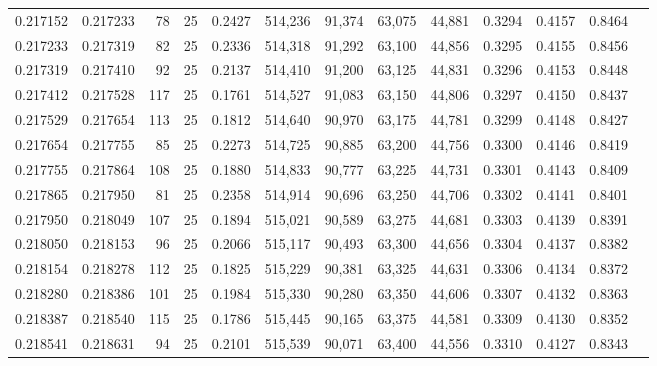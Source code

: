 \begin{tabular}{rrrrrrrrrrrrr}
0.217152 & 0.217233 &    78 &  25 &                                     0.2427 & 514,236 &  91,374 &  63,075 &  44,881 & 0.3294 & 0.4157 & 0.8464 \\
0.217233 & 0.217319 &    82 &  25 &                                     0.2336 & 514,318 &  91,292 &  63,100 &  44,856 & 0.3295 & 0.4155 & 0.8456 \\
0.217319 & 0.217410 &    92 &  25 &                                     0.2137 & 514,410 &  91,200 &  63,125 &  44,831 & 0.3296 & 0.4153 & 0.8448 \\
0.217412 & 0.217528 &   117 &  25 &                                     0.1761 & 514,527 &  91,083 &  63,150 &  44,806 & 0.3297 & 0.4150 & 0.8437 \\
0.217529 & 0.217654 &   113 &  25 &                                     0.1812 & 514,640 &  90,970 &  63,175 &  44,781 & 0.3299 & 0.4148 & 0.8427 \\
0.217654 & 0.217755 &    85 &  25 &                                     0.2273 & 514,725 &  90,885 &  63,200 &  44,756 & 0.3300 & 0.4146 & 0.8419 \\
0.217755 & 0.217864 &   108 &  25 &                                     0.1880 & 514,833 &  90,777 &  63,225 &  44,731 & 0.3301 & 0.4143 & 0.8409 \\
0.217865 & 0.217950 &    81 &  25 &                                     0.2358 & 514,914 &  90,696 &  63,250 &  44,706 & 0.3302 & 0.4141 & 0.8401 \\
0.217950 & 0.218049 &   107 &  25 &                                     0.1894 & 515,021 &  90,589 &  63,275 &  44,681 & 0.3303 & 0.4139 & 0.8391 \\
0.218050 & 0.218153 &    96 &  25 &                                     0.2066 & 515,117 &  90,493 &  63,300 &  44,656 & 0.3304 & 0.4137 & 0.8382 \\
0.218154 & 0.218278 &   112 &  25 &                                     0.1825 & 515,229 &  90,381 &  63,325 &  44,631 & 0.3306 & 0.4134 & 0.8372 \\
0.218280 & 0.218386 &   101 &  25 &                                     0.1984 & 515,330 &  90,280 &  63,350 &  44,606 & 0.3307 & 0.4132 & 0.8363 \\
0.218387 & 0.218540 &   115 &  25 &                                     0.1786 & 515,445 &  90,165 &  63,375 &  44,581 & 0.3309 & 0.4130 & 0.8352 \\
0.218541 & 0.218631 &    94 &  25 &                                     0.2101 & 515,539 &  90,071 &  63,400 &  44,556 & 0.3310 & 0.4127 & 0.8343 \\

\end{tabular}

